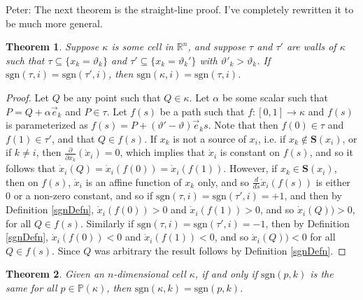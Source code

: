 \documentclass[12pt]{article}
\newtheorem{theorem}{Theorem}[section]
\theoremstyle{definition}
\theoremstyle{remark}
\newcommand\sgn{\text{sgn}}
\newcommand{\bbP}{\mathbb{P}}
\begin{document}
{\color{cyan} Peter: The next theorem is the straight-line proof. I've completely rewritten it to be much more general.}

\begin{theorem} \label{straightlineproof}
Suppose $\kappa$ is some cell in $\mathbb{R}^n$, and suppose $\tau$ and $\tau'$ are walls of $\kappa$ such that $\tau \subseteq \{x_k=\vartheta_k\}$ and $\tau' \subseteq \{x_k=\vartheta_k'\}$ with $\vartheta'_k > \vartheta_k$. If $\sgn(\tau,i)=\sgn(\tau',i)$, then $\sgn(\kappa,i)=\sgn(\tau,i)$.
\end{theorem}

\begin{proof}
Let $Q$ be any point such that $Q\in\kappa$. Let $\alpha$ be some scalar such that $P=Q +\alpha \vec e_k $ and $P \in \tau$. Let $f(s)$ be a path such that $f:[0,1]\to\kappa$ and $f(s)$ is parameterized as $f(s)=  P + (\vartheta'-\vartheta)\vec e_ks$.  Note that then $f(0) \in \tau$ and $f(1) \in \tau'$, and that $Q\in f(s)$. If $x_k$ is not a source of $x_i$, i.e. if $x_k \notin \mathbf{S}(x_i)$, or if $k\neq i$, then $\frac{\partial}{\partial x_k}(\dot x_i)=0$, which implies that $\dot x_i$ is constant on $f(s)$, and so it follows that $\dot x_i (Q)=\dot x_i (f(0))=\dot x_i (f(1))$. However, if $x_k \in \mathbf{S}(x_i)$, then on $f(s)$, $\dot x_i$ is an affine function of $x_k$ only, and so $\frac{d}{ds}\dot x_i(f(s))$ is either $0$ or a non-zero constant, and so if $\sgn(\tau,i)=\sgn(\tau',i)=+1$, and then by Definition \ref{sgnDefn}, $\dot x_i (f(0))>0$ and $\dot x_i (f(1))>0$, and so $\dot x_i (Q))>0$, for all $Q\in f(s)$. Similarly if $\sgn(\tau,i)=\sgn(\tau',i)=-1$, then by Definition \ref{sgnDefn}, $\dot x_i (f(0))<0$ and $\dot x_i (f(1))<0$, and so $\dot x_i (Q))<0$ for all $Q\in f(s)$. Since $Q$ was arbitrary the result follows by Definition \ref{sgnDefn}.
\end{proof}

\begin{theorem} \label{cornerpointproof}
Given an $n$-dimensional cell $\kappa$, if and only if $\sgn(p,k)$ is the same for all $p\in \bbP (\kappa)$,  then $\sgn(\kappa,k)=\sgn(p,k)$. 
\end{theorem}
\end{document}
